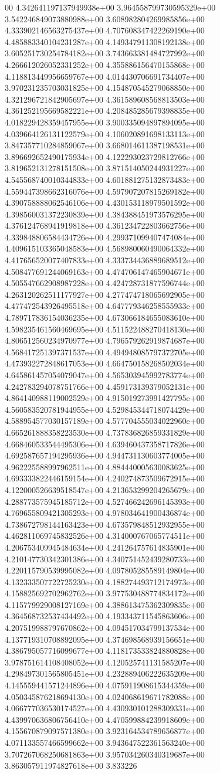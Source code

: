 00	4.342641197137949938e+00	3.964558799730595329e+00	3.542246849073880988e+00	3.608982804269985856e+00	4.333902146563275437e+00	4.707608347422269190e+00	4.485883340104231287e+00	4.149347911308192138e+00	3.605251730254784182e+00	3.743663381484727992e+00	4.266612026052331252e+00	4.355886156470155868e+00	4.118813449956659767e+00	4.014430706691734407e+00	3.970231235703031825e+00	4.154870545279068850e+00	4.321296721842905697e+00	4.361589608568813503e+00	4.361252195669582221e+00	4.208485285679398835e+00	4.018229428359457955e+00	3.900335094897894095e+00	4.039664126131122579e+00	4.106020891698133113e+00	3.847357710284859067e+00	3.668014611387198531e+00	3.896692652490175934e+00	4.122293023729812766e+00	3.819652131278151508e+00	3.871514050244931227e+00	4.545568740010344833e+00	4.601881275132873483e+00	4.559447398662316076e+00	4.597907207815269182e+00	4.390758888062546106e+00	4.430153118979501592e+00	4.398560031372230839e+00	4.384388451973576295e+00	4.376124768941919818e+00	4.361234722803662756e+00	4.339848806584434726e+00	4.299371099407474084e+00	4.409615103365048583e+00	4.568980060490064332e+00	4.417656520077407833e+00	4.333734436889689512e+00	4.508477691244069163e+00	4.474706147465904671e+00	4.505547662908987228e+00	4.424728731877596744e+00	4.263120262511177927e+00	4.277474718065692905e+00	4.477472543926495518e+00	4.647779346258555933e+00	4.789717836154036235e+00	4.673066184655083610e+00	4.598235461560469695e+00	4.511522488270418130e+00	4.806512560234970977e+00	4.796579262919874687e+00	4.568417251397371537e+00	4.494948085797372705e+00	4.473932272848617053e+00	4.664750158268502034e+00	4.645861457054079047e+00	4.565303945992783774e+00	4.242783294078751766e+00	4.459173139379052131e+00	4.864140988119002529e+00	4.915019273991427795e+00	4.560583520781944955e+00	4.529845344718074429e+00	4.588954577030157189e+00	4.577704555034022960e+00	4.665261888358223530e+00	4.737836826859331829e+00	4.668460533544495306e+00	4.639460437358717826e+00	4.692587657194295936e+00	4.944731130603774005e+00	4.962225588997962511e+00	4.884440005630083625e+00	4.693333822446159154e+00	4.240274873509672915e+00	4.122000526639518547e+00	4.213653299204265679e+00	4.288773575945185712e+00	4.527466242696145393e+00	4.769655809421305293e+00	4.978034641900436874e+00	4.738672798144163423e+00	4.673579848512932955e+00	4.462811069745832526e+00	4.314000767065774511e+00	4.206753409945484634e+00	4.241264757614835901e+00	4.210147730342301386e+00	4.340751452439280733e+00	4.220115790539995082e+00	4.097805285589149804e+00	4.132333507722725230e+00	4.188274493712174973e+00	4.158825692702962762e+00	3.977530488774834172e+00	4.115779929008127169e+00	4.388613475362309835e+00	4.364568732537434492e+00	4.193343711545863606e+00	4.207519988797670862e+00	4.094517034799137534e+00	4.137719310708892095e+00	4.374698568939156651e+00	4.386795057716099677e+00	4.118173533824880828e+00	3.978751614108408052e+00	4.120525741131585207e+00	4.298497301565805451e+00	4.232889406222635209e+00	4.145559441571244896e+00	4.075911908615344359e+00	4.050345876218694130e+00	4.024068619671782088e+00	4.066777036530174527e+00	4.430930101288309331e+00	4.439970636806756410e+00	4.470599884239918609e+00	4.155670879097571380e+00	3.923164534789656877e+00	4.071133557466599662e+00	3.943647522361563240e+00	3.707267068250681863e+00	3.957034260340319687e+00	3.863057911974827618e+00	3.833226